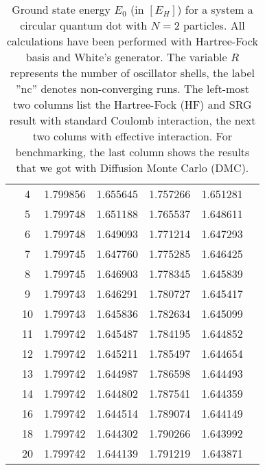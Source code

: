 \begin{table}[h!]
\begin{center}
\begin{tabular}{|c|c|c|c|c|c|c|}
& 4&1.799856 & 1.655645 &1.757266 &1.651281 & \\
& 5&1.799748 &1.651188 &1.765537 &1.648611 & \\
& 6&1.799748 &1.649093 &1.771214 &1.647293 & \\
& 7&1.799745 &1.647760 &1.775285 &1.646425 & \\
& 8&1.799745 &1.646903 &1.778345 &1.645839 & \\
& 9&1.799743 &1.646291 &1.780727 &1.645417 & \\
& 10&1.799743 &1.645836 &1.782634 &1.645099 & \\
& 11&1.799742 &1.645487 &1.784195 &1.644852 & \\
& 12&1.799742 &1.645211 &1.785497 &1.644654 & \\
& 13&1.799742&1.644987 & 1.786598 & 1.644493 & \\
&14 &1.799742 &1.644802 &1.787541 &1.644359 & \\
&16 &1.799742 &1.644514 &1.789074 &1.644149 & \\
& 18&1.799742 &1.644302 &1.790266 &1.643992 & \\
&20& 1.799742 &1.644139 &1.791219 &1.643871 & \\
\hline
\end{tabular}
\end{center}
\caption{Ground state energy $E_0$ (in $\left[E_H\right]$) for a system a circular quantum dot with $N=2$ particles. All calculations have been performed with Hartree-Fock basis and White's generator. The variable $R$ represents the number of oscillator shells, the label ''nc'' denotes non-converging runs. The left-most two columns list the Hartree-Fock (HF) and SRG result with standard Coulomb interaction, the next two colums with effective interaction.
For benchmarking, the last column shows the results that we got with Diffusion Monte Carlo (DMC).}
\label{tab:fulltab1}
\end{table}



